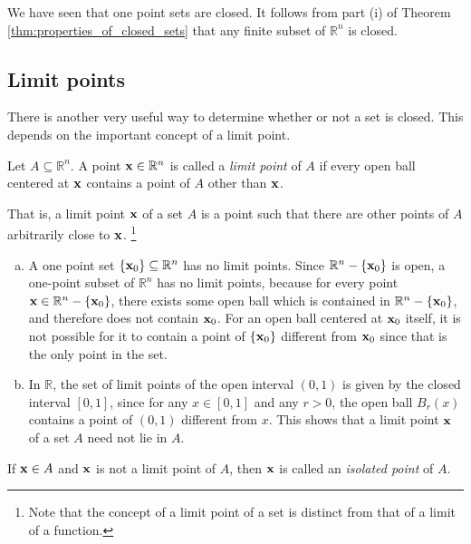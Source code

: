 \documentclass[12pt,letterpaper,reqno]{article}
\numberwithin{equation}{section}
\newcommand{\R}{\ensuremath{\mathbb R}}
\newcommand{\bx}{{\bf x}}
\begin{document}
{\begin{example}
	We have seen that one point sets are closed. It follows from part (i) of Theorem \ref{thm:properties_of_closed_sets} that any finite subset of $\R^n$ is closed. 
\end{example}

\subsection{Limit points}
There is another very useful way to determine whether or not a set is closed. This depends on the important concept of a limit point.

\begin{defn}
	Let $A \subseteq \R^n$. A point $\bx \in \R^n$ is called a \emph{limit point} of $A$ if every open ball centered at $\bx$ contains a point of $A$ other than $\bx$.
\end{defn}
That is, a limit point $\bx$ of a set $A$ is a point such that there are other points of $A$ arbitrarily close to $\bx$. \footnote{Note that the concept of a limit point of a set is distinct from that of a limit of a function.}

\begin{example}\label{ex:limit_pts}
\begin{enumerate}[(a)]
	\item A one point set $\{\bx_0\} \subseteq \R^n$ has no limit points. Since $\R^n-\{\bx_0\}$ is open, a one-point subset of $\R^n$ has no limit points, because for every point $\bx \in \R^n-\{\bx_0\}$, there exists some open ball which is contained in $\R^n-\{\bx_0\}$, and therefore does not contain $\bx_0$. For an open ball centered at $\bx_0$ itself, it is not possible for it to contain a point of $\{\bx_0\}$ different from $\bx_0$ since that is the only point in the set.
	\item In $\R$, the set of limit points of the open interval $(0,1)$ is given by the closed interval $[0,1]$, since for any $x \in [0,1]$ and any $r>0$, the open ball $B_r(x)$ contains a point of $(0,1)$ different from $x$. This shows that a limit point $\bx$ of a set $A$ need not lie in $A$.
\end{enumerate}	
\end{example}

\begin{defn}
If $\bx \in A$ and $\bx$ is not a limit point of $A$, then $\bx$ is called an \emph{isolated point} of $A$.	
\end{defn}

}
\end{document}
